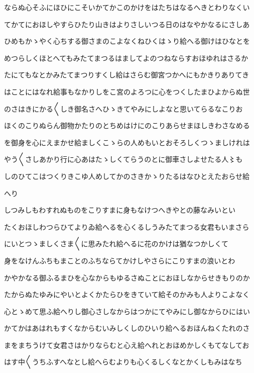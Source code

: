 \documentclass[a4paper,11pt,landscape]{ltjtarticle}
\begin{document}
ならぬ心そふにほひにこそいかてかこのかけをはたちはなるへきとわりなくい
\par\medskip
てかてにおほしやすらひたり山きはよりさしいつる日のはなやかなるにさしあ
\par\medskip
ひめもかゝやく心ちする御さまのこよなくねひくはゝり給へる御けはひなとを
\par\medskip
めつらしくほとへてもみたてまつるはましてよのつねならすおほゆれはさるか
\par\medskip
たにてもなとかみたてまつりすくし給はさらむ御宮つかへにもかきりありてき
\par\medskip
はことにはなれ給事もなかりしをこ宮のよろつに心をつくしたまひよからぬ世
\par\medskip
のさはきにかる〱しき御名さへひゝきてやみにしよなと思いてらるなこりお
\par\medskip
ほくのこりぬらん御物かたりのとちめはけにのこりあらせまほしきわさなめる
\par\medskip
を御身を心にえまかせ給ましくこゝらの人めもいとおそろしくつゝましけれは
\par\medskip
やう〱さしあかり行に心あはたゝしくてらうのとに御車さしよせたる人〻も
\par\medskip
しのひてこはつくりきこゆ人めしてかのさきかゝりたるはなひとえたおらせ給
\par\medskip
へり
\par\medskip
しつみしもわすれぬものをこりすまに身もなけつへきやとの藤なみいとい
\par\medskip
たくおほしわつらひてよりゐ給へるを心くるしうみたてまつる女君もいまさら
\par\medskip
にいとつゝましくさま〱に思みたれ給へるに花のかけは猶なつかしくて
\par\medskip
身をなけんふちもまことのふちならてかけしやさらにこりすまの浪いとわ
\par\medskip
かやかなる御ふるまひを心なからもゆるさぬことにおほしなからせきもりのか
\par\medskip
たからぬたゆみにやいとよくかたらひをきていて給そのかみも人よりこよなく
\par\medskip
心とゝめて思ふ給へりし御心さしなからはつかにてやみにし御なからひにはい
\par\medskip
かてかはあはれもすくなからむいみしくしのひいり給へるおほんねくたれのさ
\par\medskip
まをまちうけて女君さはかりならむと心え給へれとおほめかしくもてなしてお
\par\medskip
はす中〱うちふすへなとし給へらむよりも心くるしくなとかくしもみはなち
\par\medskip
\end{document}

